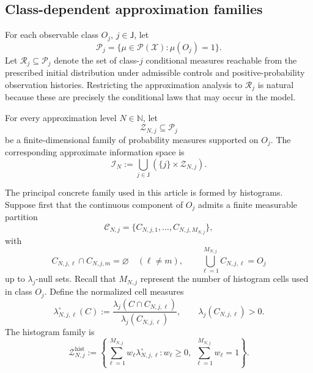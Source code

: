 \documentclass[10pt,twocolumn]{article}
\theoremstyle{remark}
\newcommand{\N}{\mathbb{N}}
\newcommand{\Pcal}{\mathcal{P}}
\newcommand{\Xcal}{\mathcal{X}}
\newcommand{\Ical}{\mathcal{I}}
\begin{document}
\subsection{Class-dependent approximation families}
\label{subsec:class-dependent-families}

For each observable class \(O_j\), \(j\in\mathsf J\), let
\[
\Pcal_j
=
\{\mu\in\Pcal(\Xcal):\mu(O_j)=1\}.
\]
Let \(\mathcal R_j\subseteq\Pcal_j\) denote the set of class-\(j\) conditional measures reachable from the prescribed initial distribution under admissible controls and positive-probability observation histories. Restricting the approximation analysis to \(\mathcal R_j\) is natural because these are precisely the conditional laws that may occur in the model.

For every approximation level \(N\in\N\), let
\begin{equation*}
	\mathcal Z_{N,j}\subseteq\Pcal_j
	\label{eq:class-approximation-family}
\end{equation*}
be a finite-dimensional family of probability measures supported on \(O_j\). The corresponding approximate information space is
\begin{equation}
	\Ical_N
	:=
	\bigcup_{j\in\mathsf J}
	\left(
	\{j\}\times\mathcal Z_{N,j}
	\right).
	\label{eq:approximate-information-space}
\end{equation}

The principal concrete family used in this article is formed by histograms. Suppose first that the continuous component of \(O_j\) admits a finite measurable partition
\[
\mathscr C_{N,j}
=
\{C_{N,j,1},\ldots,C_{N,j,M_{N,j}}\},
\]
with
\[
C_{N,j,\ell}\cap C_{N,j,m}=\varnothing
\quad(\ell\neq m),
\qquad
\bigcup_{\ell=1}^{M_{N,j}}C_{N,j,\ell}=O_j
\]
up to \(\lambda_j\)-null sets. Recall that \(M_{N,j}\) represent the number of histogram cells used in class \(O_j\). Define the normalized cell measures
\begin{equation}
	\lambda_{N,j,\ell}^{\circ}(C)
	:=
	\frac{\lambda_j(C\cap C_{N,j,\ell})}
	{\lambda_j(C_{N,j,\ell})},
	\qquad
	\lambda_j(C_{N,j,\ell})>0.
	\label{eq:normalized-cell-measure}
\end{equation}
The histogram family is
\begin{equation}
	\mathcal Z_{N,j}^{\mathrm{hist}}
	:=
	\left\{
	\sum_{\ell=1}^{M_{N,j}}
	w_\ell\lambda_{N,j,\ell}^{\circ}
	:
	w_\ell\geq0,\;
	\sum_{\ell=1}^{M_{N,j}}w_\ell=1
	\right\}.
	\label{eq:histogram-family}
\end{equation}
\end{document}

